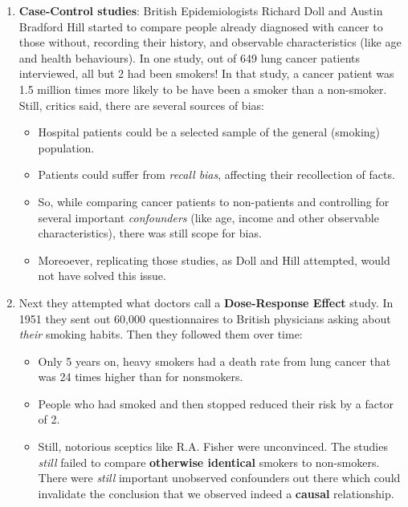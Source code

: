 \documentclass[]{book}
\providecommand{\tightlist}{%
  \setlength{\itemsep}{0pt}\setlength{\parskip}{0pt}}
\begin{document}
\begin{enumerate}
\def\labelenumi{\arabic{enumi}.}
\tightlist
\item
  \textbf{Case-Control studies}: British Epidemiologists Richard Doll and Austin Bradford Hill started to compare people already diagnosed with cancer to those without, recording their history, and observable characteristics (like age and health behaviours). In one study, out of 649 lung cancer patients interviewed, all but 2 had been smokers! In that study, a cancer patient was 1.5 million times more likely to be have been a smoker than a non-smoker. Still, critics said, there are several sources of bias:

  \begin{itemize}
  \tightlist
  \item
    Hospital patients could be a selected sample of the general (smoking) population.
  \item
    Patients could suffer from \emph{recall bias}, affecting their recollection of facts.
  \item
    So, while comparing cancer patients to non-patients and controlling for several important \emph{confounders} (like age, income and other observable characteristics), there was still scope for bias.
  \item
    Moreoever, replicating those studies, as Doll and Hill attempted, would not have solved this issue.
  \end{itemize}
\item
  Next they attempted what doctors call a \textbf{Dose-Response Effect} study. In 1951 they sent out 60,000 questionnaires to British physicians asking about \emph{their} smoking habits. Then they followed them over time:

  \begin{itemize}
  \tightlist
  \item
    Only 5 years on, heavy smokers had a death rate from lung cancer that was 24 times higher than for nonsmokers.
  \item
    People who had smoked and then stopped reduced their risk by a factor of 2.
  \item
    Still, notorious sceptics like R.A. Fisher were unconvinced. The studies \emph{still} failed to compare \textbf{otherwise identical} smokers to non-smokers. There were \emph{still} important unobserved confounders out there which could invalidate the conclusion that we observed indeed a \textbf{causal} relationship.
  \end{itemize}
\end{enumerate}
\end{document}
